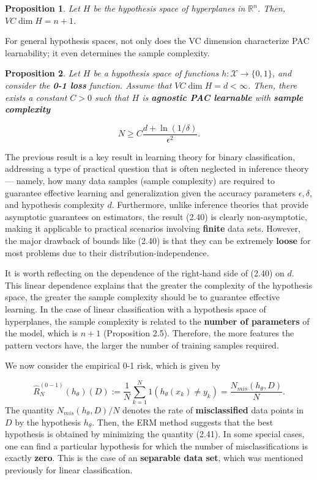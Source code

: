 \documentclass{report}
\newtheorem{proposition}{Proposition}[chapter]
\begin{document}
\begin{proposition}
Let $H$ be the hypothesis space of hyperplanes in $\mathbb{R}^n$. Then, $VC\dim H = n + 1$.
\end{proposition}
For general hypothesis spaces, not only does the VC dimension characterize PAC learnability; it even determines the sample complexity.

\begin{proposition}
Let $H$ be a hypothesis space of functions $h : \mathcal{X} \to \{0, 1\}$, and consider the \textbf{0-1 loss} function. Assume that $VC\dim H = d < \infty$. Then, there exists a constant $C> 0$ such that $H$ is \textbf{agnostic PAC learnable} with \textbf{sample complexity}

\begin{equation}
N \geq C\frac{d + \ln (1/\delta)}{\epsilon^2}.
\end{equation}
\end{proposition}
The previous result is a key result in learning theory for binary classification, addressing a type of practical question that is often neglected in inference theory — namely, how many data samples (sample complexity) are required to guarantee effective learning and generalization given the accuracy parameters $\epsilon, \delta$, and hypothesis complexity $d$. Furthermore, unlike inference theories that provide asymptotic guarantees on estimators, the result (2.40) is clearly non-asymptotic, making it applicable to practical scenarios involving \textbf{finite} data sets. However, the major drawback of bounds like (2.40) is that they can be extremely \textbf{loose} for most problems due to their distribution-independence.

It is worth reflecting on the dependence of the right-hand side of (2.40) on $d$. This linear dependence explains that the greater the complexity of the hypothesis space, the greater the sample complexity should be to guarantee effective learning. In the case of linear classification with a hypothesis space of hyperplanes, the sample complexity is related to the \textbf{number of parameters} of the model, which is $n + 1$ (Proposition 2.5). Therefore, the more features the pattern vectors have, the larger the number of training samples required.

We now consider the empirical 0-1 risk, which is given by

\begin{equation}
\hat{R}^{(0-1)}_N(h_\theta)(D) := \frac{1}{N}\sum_{k=1}^{N}1(h_\theta(x_k) \neq y_k) = \frac{N_{mis}(h_\theta,D)}{N}.
\end{equation}
The quantity $N_{mis}(h_\theta,D)/N$ denotes the rate of \textbf{misclassified} data points in $D$ by the hypothesis $h_\theta$. Then, the ERM method suggests that the best hypothesis is obtained by minimizing the quantity (2.41). In some special cases, one can find a particular hypothesis for which the number of misclassifications is exactly \textbf{zero}. This is the case of an \textbf{separable data set}, which was mentioned previously for linear classification.
\end{document}
